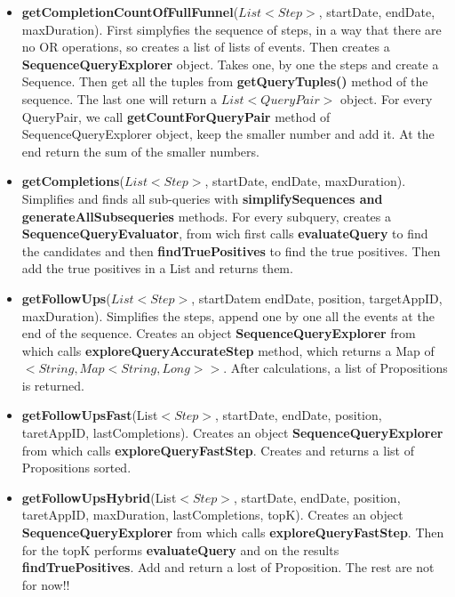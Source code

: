 \documentclass{article}
\begin{document}
\begin{itemize}
\begin{itemize}
	\item \textbf{getCompletionCountOfFullFunnel}($List<Step>$, startDate, endDate, maxDuration). First simplyfies the sequence of steps, in a way that there are no OR operations, so creates a list of lists of events. Then creates a \textbf{SequenceQueryExplorer} object. Takes one, by one the steps and create a Sequence. Then get all the tuples from \textbf{getQueryTuples()} method of the sequence. The last one will return a $List<QueryPair>$ object. For every QueryPair, we call \textbf{getCountForQueryPair} method of SequenceQueryExplorer object, keep the smaller number and add it. At the end return the sum of the smaller numbers.
	\item \textbf{getCompletions}($List<Step>$, startDate, endDate, maxDuration). Simplifies and finds all sub-queries with \textbf{simplifySequences and generateAllSubsequeries} methods. For every subquery, creates a \textbf{SequenceQueryEvaluator}, from wich first calls \textbf{evaluateQuery} to find the candidates and then \textbf{findTruePositives} to find the true positives. Then add the true positives in a List and returns them.
	\item \textbf{getFollowUps}($List<Step>$, startDatem endDate, position, targetAppID, maxDuration). Simplifies the steps, append one by one all the events at the end of the sequence. Creates an object \textbf{SequenceQueryExplorer} from which calls \textbf{exploreQueryAccurateStep} method, which returns a Map of $<String, Map<String, Long>>$. After calculations, a list of Propositions is returned.
	\item \textbf{getFollowUpsFast}(List$<Step>$, startDate, endDate, position, taretAppID, lastCompletions). Creates an object \textbf{SequenceQueryExplorer} from which calls \textbf{exploreQueryFastStep}. Creates and returns a list of Propositions sorted.
	\item \textbf{getFollowUpsHybrid}(List$<Step>$, startDate, endDate, position, taretAppID, maxDuration, lastCompletions, topK). Creates an object \textbf{SequenceQueryExplorer} from which calls \textbf{exploreQueryFastStep}. Then for the topK performs \textbf{evaluateQuery} and on the results \textbf{findTruePositives}. Add and return a lost of Proposition.
	The rest are not for now!!
\end{itemize}
\end{itemize}
\end{document}
